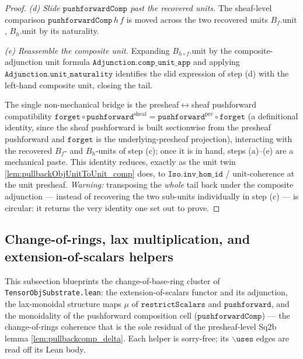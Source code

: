 \begin{proof}
  \emph{(d) Slide \(\mathtt{pushforwardComp}\) past the recovered units.} The sheaf-level
  comparison \(\mathtt{pushforwardComp}\,h\,f\) is moved across the two recovered units
  \(B_f.\mathrm{unit}\), \(B_h.\mathrm{unit}\) by its naturality.

  \emph{(e) Reassemble the composite unit.} Expanding
  \(B_{h \circ f}.\mathrm{unit}\) by the composite-adjunction unit formula
  \(\mathtt{Adjunction.comp\_unit\_app}\) and applying \(\mathtt{Adjunction.unit\_naturality}\)
  identifies the slid expression of step (d) with the left-hand composite unit, closing the
  tail.

  The single non-mechanical bridge is the presheaf\(\leftrightarrow\)sheaf pushforward
  compatibility \(\mathtt{forget} \circ \mathtt{pushforward}^{\mathrm{sheaf}} =
  \mathtt{pushforward}^{\mathrm{pre}} \circ \mathtt{forget}\) (a definitional identity, since
  the sheaf pushforward is built sectionwise from the presheaf pushforward and
  \(\mathtt{forget}\) is the underlying-presheaf projection), interacting with the recovered
  \(B_f\)- and \(B_h\)-units of step (c); once it is in hand, steps (a)--(e) are a mechanical
  paste. This identity reduces, exactly as the unit twin
  \cref{lem:pullbackObjUnitToUnit_comp} does, to \(\mathtt{Iso.inv\_hom\_id}\) /
  unit-coherence at the unit presheaf. \emph{Warning:} transposing the \emph{whole} tail back
  under the composite adjunction --- instead of recovering the two sub-units individually in
  step (c) --- is circular: it returns the very identity one set out to prove.
\end{proof}

\subsection{Change-of-rings, lax multiplication, and extension-of-scalars helpers}
\label{subsec:tensorobj_changeofrings_helpers}

This subsection blueprints the change-of-base-ring cluster of
\texttt{TensorObjSubstrate.lean}: the extension-of-scalars functor and its adjunction,
the lax-monoidal structure maps \(\mu\) of \(\mathtt{restrictScalars}\) and
\(\mathtt{pushforward}\), and the monoidality of the pushforward composition cell
(\(\mathtt{pushforwardComp}\)) --- the change-of-rings coherence that is the sole residual
of the presheaf-level Sq2b lemma \cref{lem:pullbackcomp_delta}. Each helper is sorry-free;
its \(\mathtt{\backslash uses}\) edges are read off its Lean body.

